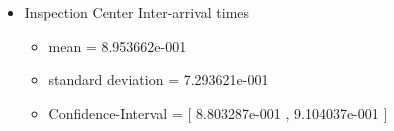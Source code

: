 \documentclass[aps,letterpaper,10pt]{revtex4}
\begin{document}
\begin{itemize}
\begin{figure}[htp]
\begin{center}
{                        }
                        \end{center}
                    \end{figure}
                \item Inspection Center Inter-arrival times
                    \begin{itemize}
                        \item mean = 8.953662e-001
                        \item standard deviation = 7.293621e-001
                        \item Confidence-Interval = [ 8.803287e-001 , 9.104037e-001 ]
                    \end{itemize}
                    \begin{figure}[htp]
                        \begin{center}
                        \end{center}
                    \end{figure}
            \end{itemize}

        \newpage
\end{document}
